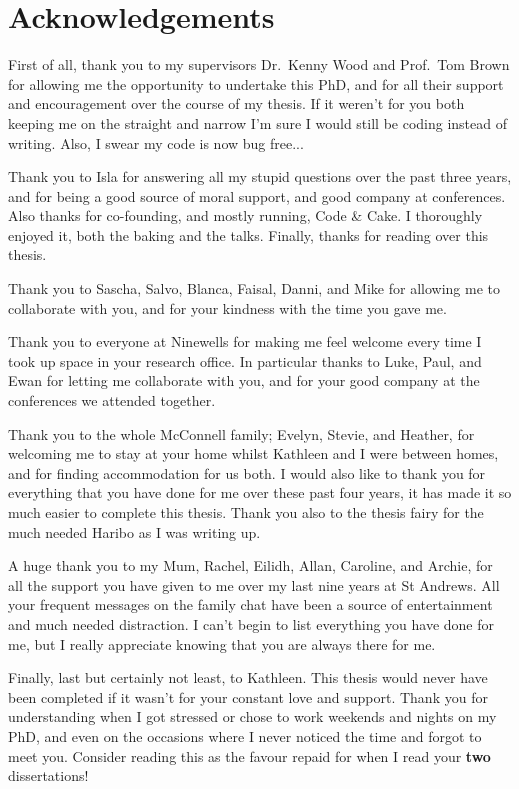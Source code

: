 \documentclass[10pt,a4paper,twoside]{book}
\begin{document}
\chapter{Acknowledgements}
First of all, thank you to my supervisors Dr.~Kenny Wood and Prof.~Tom Brown for allowing me the opportunity to undertake this PhD, and for all their support and encouragement over the course of my thesis.
If it weren't for you both keeping me on the straight and narrow I'm sure I would still be coding instead of writing.
Also, I swear my code is now bug free...
\medskip


Thank you to Isla for answering all my stupid questions over the past three years, and for being a good source of moral support, and good company at conferences.
Also thanks for co-founding, and mostly running, Code \& Cake. I thoroughly enjoyed it, both the baking and the talks.
Finally, thanks for reading over this thesis.
\medskip

Thank you to Sascha, Salvo, Blanca, Faisal, Danni, and Mike for allowing me to collaborate with you, and for your kindness with the time you gave me.
\medskip

Thank you to everyone at Ninewells for making me feel welcome every time I took up space in your research office.
In particular thanks to Luke, Paul, and Ewan for letting me collaborate with you, and for your good company at the conferences we attended together.
\medskip

Thank you to the whole McConnell family; Evelyn, Stevie, and Heather, for welcoming me to stay at your home whilst Kathleen and I were between homes, and for finding accommodation for us both.
I would also like to thank you for everything that you have done for me over these past four years, it has made it so much easier to complete this thesis.
Thank you also to the thesis fairy for the much needed Haribo as I was writing up.
\medskip

A huge thank you to my Mum, Rachel, Eilidh, Allan, Caroline, and Archie, for all the support you have given to me over my last nine years at St Andrews.
All your frequent messages on the family chat have been a source of entertainment and much needed distraction.
I can't begin to list everything you have done for me, but I really appreciate knowing that you are always there for me.
\medskip

Finally, last but certainly not least, to Kathleen.
This thesis would never have been completed if it wasn't for your constant love and support.
Thank you for understanding when I got stressed or chose to work weekends and nights on my PhD, and even on the occasions where I never noticed the time and forgot to meet you.
\noindent Consider reading this as the favour repaid for when I read your \textbf{two} dissertations!
\end{document}
